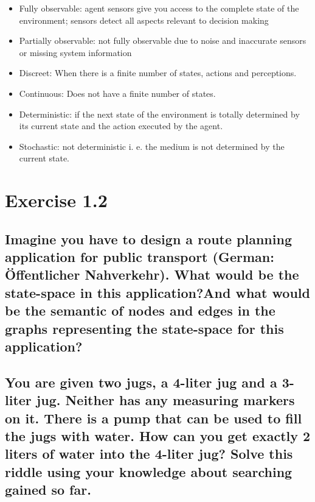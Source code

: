 \documentclass[paper=a4, fontsize=11pt]{scrartcl} %
\numberwithin{equation}{section} %
\numberwithin{figure}{section} %
\numberwithin{table}{section} %
\begin{document}
\begin{itemize}
\item Fully observable: agent sensors give you access to the complete state of the environment; sensors detect all aspects relevant to decision making \\
\item Partially observable: not fully observable due to noise and inaccurate sensors or missing system information \\
\item Discreet: When there is a finite number of states, actions and perceptions.\\
\item Continuous: Does not have a finite number of states.\\
\item Deterministic: if the next state of the environment is totally determined by its current state and the action executed by the agent. \\      
\item Stochastic: not deterministic i. e. the medium is not determined by the current state. \\
\end{itemize}
\newpage




\section{Exercise 1.2}


\subsection{Imagine you have to design a route planning application for public transport (German: Öffentlicher Nahverkehr). What would be the state-space in this application?And what would be the semantic of nodes and edges in the graphs representing the state-space for this application?}

\newpage

\subsection{You are given two jugs, a 4-liter jug and a 3-liter jug. Neither has any measuring markers on it. There is a pump that can be used to fill the jugs with water. How can you get exactly 2 liters of water into the 4-liter jug? Solve this riddle using your knowledge about searching gained so far.}
\end{document}
